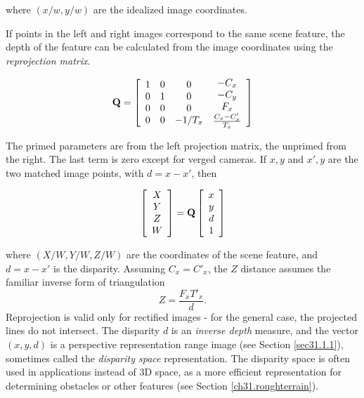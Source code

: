 \documentclass[twocolumn,oneside]{book}
\def\vec#1{\begin{array}{c}#1\end{array}}
\begin{document}
\noindent where $(x/w, y/w)$ are the idealized image coordinates.

If points in the left and right images correspond to the same scene
feature, the depth of the feature can be calculated from the image
coordinates using the {\em reprojection matrix}.

\begin{eqnarray}
\bf{Q} =
\left[ 
\vec{1 \\ 0 \\ 0 \\ 0}
\vec{0 \\ 1 \\ 0 \\ 0}
\vec{0 \\ 0 \\ 0 \\ -1/T_x}
\vec{-C_x \\ -C_y \\ F_x \\ \frac{C_x - C_x'}{T_x}} 
\right]
\end{eqnarray}

\noindent The primed parameters are from the left projection matrix, the
unprimed from the right.  The last term is zero except for verged
cameras.  If $x,y$ and $x',y$ are the two matched image points, with
$d=x-x'$, then 

\begin{eqnarray}
\left[
\vec{X\\ Y\\ Z\\ W}
\right] 
=
 \bf{Q} \left[ \vec{x\\ y\\ d \\ 1} \right]
\label{reprojection.eq.ch31}
\end{eqnarray}
 
\noindent where $(X/W, Y/W, Z/W)$ are the coordinates of the scene
feature, and $d = x - x'$ is the disparity.  Assuming $C_x = C'_x$,
the $Z$ distance assumes the familiar inverse form of triangulation
\begin{equation}
 Z = \frac{F_x T'_x}{d}.
\label{eq31.disparity-range}
\end{equation}
\noindent Reprojection is valid only for rectified images - for the general
case, the projected lines do not intersect.
The disparity $d$ is an {\em inverse depth}
measure, and the vector $(x,y,d)$ is a perspective representation
range image (see Section \ref{sec31.1.1}), sometimes called the {\em
disparity space} representation.  The disparity space is often used in
applications instead of 3D space, as a more efficient representation
for determining obstacles or other features (see Section
\ref{ch31.roughterrain}).
\end{document}
